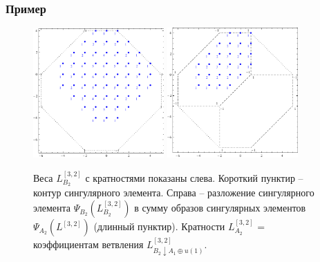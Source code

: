 \documentclass[pdftex]{beamer}
\theoremstyle{definition} \newtheorem{Def}{Определение}
\begin{document}
\begin{frame}
  \frametitle{Пример}
  \vspace{-0.5cm}
\begin{figure}[h!bt]
  \hspace*{-1.2cm}

   \includegraphics[width=50mm]{figures/b2}
   \includegraphics[width=50mm]{figures/b2-a2-a1}
  \caption{Веса  $L^{[3,2]}_{B_{2}}$  с кратностями показаны слева. Короткий пунктир -- контур сингулярного элемента. Справа -- разложение сингулярного элемента $\Psi_{B_{2}}(L^{[3,2]}_{B_{2}})$ в сумму образов сингулярных элементов $\Psi_{A_{2}}(L^{[3,2]})$ (длинный пунктир). Кратности $L^{[3,2]}_{A_{2}}$ =  коэффициентам ветвления $L^{[3,2]}_{B_{2}\downarrow A_{1}\oplus u(1)}$.}

 \label{fig:b2_splint}
\end{figure}

\end{frame}
\end{document}
